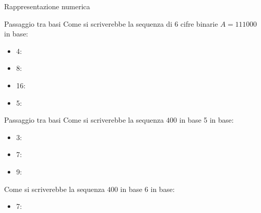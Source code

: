 \documentclass[11pt]{article}
\begin{document}
\begin{quiz}{Rappresentazione numerica}

\begin{cloze}[points=1,shuffle=false]{Passaggio tra basi}
Come si scriverebbe la sequenza di 6 cifre binarie $A = 111000$ in base:
\begin{itemize}
\item 4: 
\item 8: 
\item 16: 
\item 5: 
\end{itemize}
\end{cloze}

\begin{cloze}[points=1,shuffle=false]{Passaggio tra basi}
Come si scriverebbe la sequenza $400$ in base 5 in base:
\begin{itemize}
\item 3: 
\item 7: 
\item 9: 
\end{itemize}

Come si scriverebbe la sequenza $400$ in base 6 in base:
\begin{itemize}
\item 7: 
\end{itemize}
\end{cloze}


\end{quiz}
\end{document}

